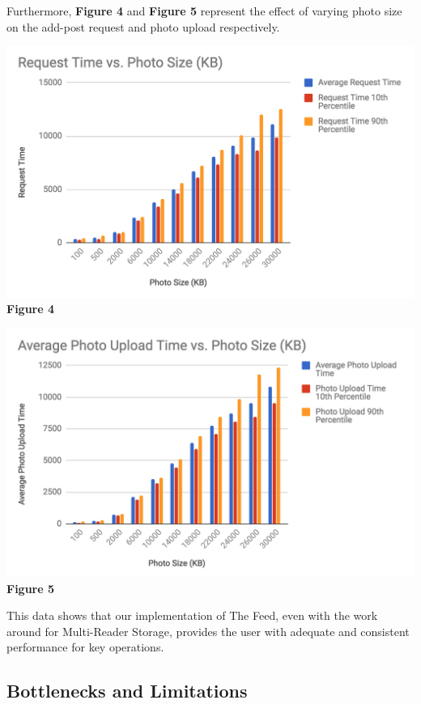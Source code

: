 \documentclass[pageno]{jpaper}
\begin{document}
\begin{multicols*}{2}
Furthermore, \textbf{Figure 4} and \textbf{Figure 5} represent the effect of varying photo size on the add-post request and photo upload respectively.

\begin{center}
	\includegraphics[scale=0.4]{request.jpg} \\
	\textbf{Figure 4}
\end{center}

\begin{center}
	\includegraphics[scale=0.4]{photo.jpg} \\
	\textbf{Figure 5}
\end{center}

This data shows that our implementation of The Feed, even with the work around for Multi-Reader Storage, provides the user with adequate and consistent performance for key operations. 
\subsection{Bottlenecks and Limitations}
\label{section:bottlenecks}


\end{multicols*}
\end{document}
